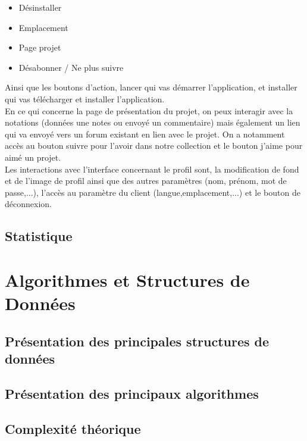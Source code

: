 \documentclass{report}
\begin{document}
\begin{itemize}
    \item Désinstaller
    \item Emplacement
    \item Page projet
    \item Désabonner / Ne plus suivre
\end{itemize}
Ainsi que les boutons d'action, lancer qui vas démarrer l'application, et installer qui vas télécharger et installer l'application.\\
En ce qui concerne la page de présentation du projet, on peux interagir avec la notations (données une notes ou envoyé un commentaire) mais également un lien qui va envoyé vers un forum existant en lien avec le projet. On a notamment accès au bouton suivre pour l'avoir dans notre collection et le bouton j'aime pour aimé un projet.\\
Les interactions avec l'interface concernant le profil sont, la modification de fond et de l'image de profil ainsi que des autres paramètres (nom, prénom, mot de passe,...), l'accès au paramètre du client (langue,emplacement,...) et le bouton de déconnexion.

\section{Statistique} %

\chapter{Algorithmes et Structures de Données}
\section{Présentation des principales structures de données}
\section{Présentation des principaux algorithmes}%
\section{Complexité théorique}
\end{document}
